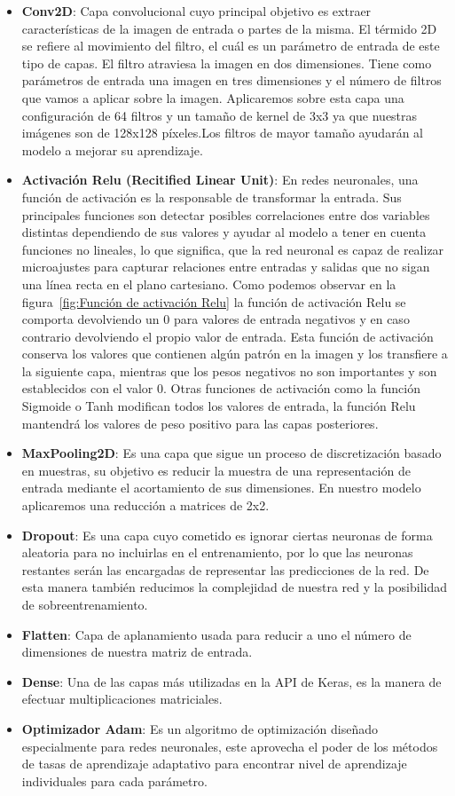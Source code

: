 \begin{itemize}
    \item \textbf{Conv2D}: Capa convolucional cuyo principal objetivo es extraer características de la imagen de entrada o partes de la misma.
    El térmido 2D se refiere al movimiento del filtro, el cuál es un parámetro de entrada de este tipo de capas.
    El filtro atraviesa la imagen en dos dimensiones.
    Tiene como parámetros de entrada una imagen en tres dimensiones y el número de filtros que vamos a aplicar sobre la imagen.
    Aplicaremos sobre esta capa una configuración de 64 filtros y un tamaño de kernel de 3x3 ya que nuestras imágenes son de 128x128 píxeles.Los filtros de mayor tamaño ayudarán al modelo a mejorar su aprendizaje.
    \item \textbf{Activación Relu (Recitified Linear Unit)}: En redes neuronales, una función de activación es la responsable de transformar la entrada.
    Sus principales funciones son detectar posibles correlaciones entre dos variables distintas dependiendo de sus valores y ayudar al modelo a tener en cuenta funciones no lineales, lo que significa, que la red neuronal es capaz de realizar microajustes para capturar relaciones entre entradas y salidas que no sigan una línea recta en el plano cartesiano.
    Como podemos observar en la figura~\ref{fig:Función de activación Relu} la función de activación Relu se comporta devolviendo un 0 para valores de entrada negativos y en caso contrario devolviendo el propio valor de entrada.
    Esta función de activación conserva los valores que contienen algún patrón en la imagen y los transfiere a la siguiente capa, mientras que los pesos negativos no son importantes y son establecidos con el valor 0.
    Otras funciones de activación como la función Sigmoide o Tanh modifican todos los valores de entrada, la función Relu mantendrá los valores de peso positivo para las capas posteriores.
    \item \textbf{MaxPooling2D}: Es una capa que sigue un proceso de discretización basado en muestras, su objetivo es reducir la muestra de una representación de entrada mediante el acortamiento de sus dimensiones.
    En nuestro modelo aplicaremos una reducción a matrices de 2x2.
    \item \textbf{Dropout}: Es una capa cuyo cometido es ignorar ciertas neuronas de forma aleatoria para no incluirlas en el entrenamiento, por lo que las neuronas restantes serán las encargadas de representar las predicciones de la red.
    De esta manera también reducimos la complejidad de nuestra red y la posibilidad de sobreentrenamiento.
    \item \textbf{Flatten}: Capa de aplanamiento usada para reducir a uno el número de dimensiones de nuestra matriz de entrada.
    \item \textbf{Dense}: Una de las capas más utilizadas en la API de Keras, es la manera de efectuar multiplicaciones matriciales.
    \item \textbf{Optimizador Adam}: Es un algoritmo de optimización diseñado especialmente para redes neuronales, este aprovecha el poder de los métodos de tasas de aprendizaje adaptativo para encontrar nivel de aprendizaje individuales para cada parámetro.
\end{itemize}

